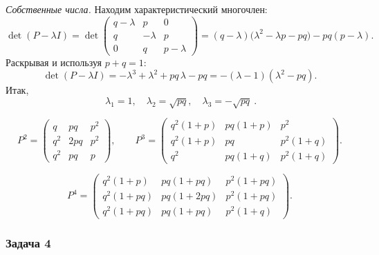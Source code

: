 \emph{Собственные числа.} Находим характеристический многочлен:
\[
	\det(P-\lambda I)=
	\det\begin{pmatrix}
		q-\lambda & p        & 0         \\
		q         & -\lambda & p         \\
		0         & q        & p-\lambda
	\end{pmatrix}
	=(q-\lambda)\bigl(\lambda^2-\lambda p-pq\bigr)-pq(p-\lambda).
\]
Раскрывая и используя $p+q=1$:
\[
	\det(P-\lambda I)
	= -\lambda^3+\lambda^2+pq\,\lambda-pq
	= -(\lambda-1)(\lambda^2-pq).
\]
Итак,
\[
	\boxed{\ \lambda_1=1,\quad \lambda_2=\sqrt{pq},\quad \lambda_3=-\sqrt{pq}\ }.
\]

\[
	P^2 =
	\begin{pmatrix}
		q   & pq  & p^2 \\
		q^2 & 2pq & p^2 \\
		q^2 & pq  & p
	\end{pmatrix},
	\qquad
	P^3 =
	\begin{pmatrix}
		q^2(1+p) & pq(1+p) & p^2      \\
		q^2(1+p) & pq      & p^2(1+q) \\
		q^2      & pq(1+q) & p^2(1+q)
	\end{pmatrix}.
\]

\[
	P^4 =
	\begin{pmatrix}
		q^2(1+p)  & pq(1+pq)  & p^2(1+pq) \\
		q^2(1+pq) & pq(1+2pq) & p^2(1+pq) \\
		q^2(1+pq) & pq(1+pq)  & p^2(1+q)
	\end{pmatrix}.
\]
\subsubsection*{Задача 4}

